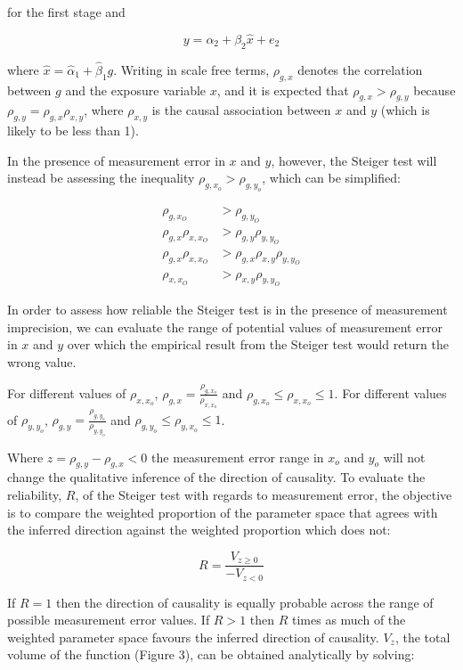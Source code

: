 \documentclass[]{article}
\begin{document}
for the first stage and

\[
y = \alpha_2 + \beta_2 \hat{x} + e_2
\]

where \(\hat{x} = \hat{\alpha}_1 + \hat{\beta}_1 g\). Writing in scale
free terms, \(\rho_{g, x}\) denotes the correlation between \(g\) and
the exposure variable \(x\), and it is expected that
\(\rho_{g, x} > \rho_{g, y}\) because
\(\rho_{g, y} = \rho_{g, x}\rho_{x, y}\), where \(\rho_{x, y}\) is the
causal association between \(x\) and \(y\) (which is likely to be less
than 1).

In the presence of measurement error in \(x\) and \(y\), however, the
Steiger test will instead be assessing the inequality
\(\rho_{g, x_o} > \rho_{g, y_o}\), which can be simplified:

\[
\begin{aligned}
\rho_{g, x_O} & > \rho_{g, y_O} \\
\rho_{g, x} \rho_{x, x_O} & > \rho_{g,y}\rho_{y,y_O}\\
\rho_{g, x} \rho_{x, x_O} & > \rho_{g,x}\rho_{x,y}\rho_{y,y_O}\\
\rho_{x, x_O} & > \rho_{x,y}\rho_{y,y_O}
\end{aligned}
\]

In order to assess how reliable the Steiger test is in the presence of
measurement imprecision, we can evaluate the range of potential values
of measurement error in \(x\) and \(y\) over which the empirical result
from the Steiger test would return the wrong value.

For different values of \(\rho_{x,x_o}\),
\(\rho_{g,x} = \frac{\rho_{g, x_o}}{\rho_{x,x_o}}\) and
\(\rho_{g,x_o} \leq \rho_{x,x_o} \leq 1\). For different values of
\(\rho_{y,y_o}\), \(\rho_{g,y} = \frac{\rho_{g, y_o}}{\rho_{y,y_o}}\)
and \(\rho_{g,y_o} \leq \rho_{y,x_o} \leq 1\).

Where \(z = \rho_{g,y} - \rho_{g,x} < 0\) the measurement error range in
\(x_o\) and \(y_o\) will not change the qualitative inference of the
direction of causality. To evaluate the reliability, \(R\), of the
Steiger test with regards to measurement error, the objective is to
compare the weighted proportion of the parameter space that agrees with
the inferred direction against the weighted proportion which does not:

\[
R = \frac{V_{z \geq 0}}{ - V_{z < 0} }
\]

If \(R=1\) then the direction of causality is equally probable across
the range of possible measurement error values. If \(R > 1\) then \(R\)
times as much of the weighted parameter space favours the inferred
direction of causality. \(V_{z}\), the total volume of the function
(Figure 3), can be obtained analytically by solving:
\end{document}
